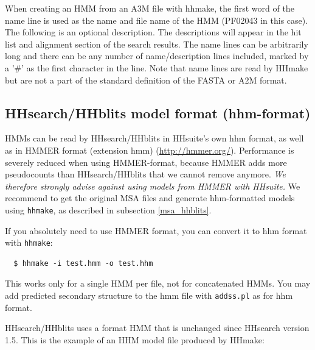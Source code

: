 \documentclass[11pt,a4paper]{article}
\begin{document}
When creating an HMM from an A3M file with hhmake, the first word of the name line is 
used as the name and file name of the HMM (PF02043 in this case). The following is an 
optional description. The descriptions will appear in the hit list and alignment section 
of the search results. The name lines can be arbitrarily long and there can be any number of 
name/description lines included, marked by a '\#' as the first character in the line. 
Note that name lines are read by HHmake but are not a part of the standard definition
of the FASTA or A2M format.
 

\subsection{HHsearch/HHblits model format (hhm-format)} \label{hhmformat}

HMMs can be read by HHsearch/HHblits in HHsuite's own hhm format, as well as in HMMER format 
(extension hmm) (\url{http://hmmer.org/}).
Performance is severely reduced when using HMMER-format, because HMMER adds more pseudocounts than HHsearch/HHblits
that we cannot remove anymore. \emph{We therefore strongly advise against using models from HMMER with HHsuite.} 
We recommend to get the original MSA files and generate hhm-formatted models using \verb`hhmake`, as described in 
subsection \ref{msa_hhblits}.

If you absolutely need to use HMMER format, you can convert it to hhm format with \verb`hhmake`:
\begin{verbatim}
  $ hhmake -i test.hmm -o test.hhm
\end{verbatim}
This works only for a single HMM per file, not for concatenated HMMs. You 
may add predicted secondary structure to the hmm file with \verb`addss.pl` as for hhm format.

HHsearch/HHblits uses a format HMM that is unchanged since HHsearch version 1.5. 
This is the example of an HHM model file produced by HHmake:
\end{document}
